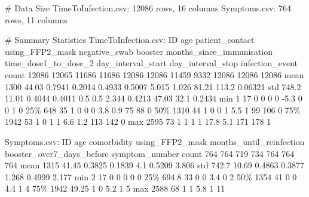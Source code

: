 \documentclass[11pt]{article}
\begin{document}
\begin{codeoutput}
\# Data Size
TimeToInfection.csv: 12086 rows, 16 columns
Symptoms.csv: 764 rows, 11 columns

\# Summary Statistics
TimeToInfection.csv:
         ID   age  patient\_contact  using\_FFP2\_mask  negative\_swab  booster  months\_since\_immunisation  time\_dose1\_to\_dose\_2  day\_interval\_start  day\_interval\_stop  infection\_event
count 12086 12065            11686            11686          12086    12086                      11459                  9332               12086              12086            12086
mean   1300 44.03           0.7941           0.2014         0.4933   0.5007                      5.015                 1.026               81.21              113.2          0.06321
std   748.2 11.01           0.4044           0.4011            0.5      0.5                      2.344                0.4213               47.03               32.1           0.2434
min       1    17                0                0              0        0                       -5.3                     0                   0                  1                0
25\%     648    35                1                0              0        0                        3.8                   0.9                  75                 88                0
50\%    1310    44                1                0              0        1                        5.5                     1                  99                106                0
75\%    1942    53                1                0              1        1                        6.6                   1.2                 113                142                0
max    2595    73                1                1              1        1                       17.8                   5.1                 171                178                1

Symptoms.csv:
         ID   age  comorbidity  using\_FFP2\_mask  months\_until\_reinfection  booster\_over7\_days\_before  symptom\_number
count   764   764          719              734                       764                        764             764
mean   1315 41.45       0.3825           0.1839                       4.1                     0.5209           3.806
std   742.7 10.69       0.4863           0.3877                     1.268                     0.4999           2.177
min       2    17            0                0                         0                          0               0
25\%   694.8    33            0                0                       3.4                          0               2
50\%    1354    41            0                0                       4.4                          1               4
75\%    1942 49.25            1                0                       5.2                          1               5
max    2588    68            1                1                       5.8                          1              11


\end{codeoutput}
\end{document}
